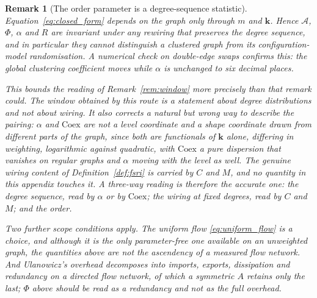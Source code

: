 \documentclass[11pt,a4paper]{article}
\newtheorem{remark}{Remark}
\begin{document}
\begin{remark}[The order parameter is a degree-sequence statistic]
\label{rem:degree_only}
Equation~\eqref{eq:closed_form} depends on the graph only through $m$ and
$\mathbf{k}$. Hence $\mathcal{A}$, $\Phi$, $\alpha$ and $R$ are invariant under
any rewiring that preserves the degree sequence, and in particular they cannot
distinguish a clustered graph from its configuration-model randomisation. A
numerical check on double-edge swaps confirms this: the global clustering
coefficient moves while $\alpha$ is unchanged to six decimal places.

This bounds the reading of Remark~\ref{rem:window} more precisely than that
remark could. The window obtained by this route is a statement about
\emph{degree distributions} and not about wiring. It also corrects a natural
but wrong way to describe the pairing: $\alpha$ and $\mathrm{Coex}$ are not a
level coordinate and a shape coordinate drawn from different parts of the
graph, since both are functionals of $\mathbf{k}$ alone, differing in
weighting, logarithmic against quadratic, with $\mathrm{Coex}$ a pure
dispersion that vanishes on regular graphs and $\alpha$ moving with the level
as well. The genuine wiring content of Definition~\ref{def:fsri} is carried by
$C$ and $M$, and no quantity in this appendix touches it. A three-way reading
is therefore the accurate one: the degree sequence, read by $\alpha$ or by
$\mathrm{Coex}$; the wiring at fixed degrees, read by $C$ and $M$; and the
order.

Two further scope conditions apply. The uniform flow \eqref{eq:uniform_flow} is
a choice, and although it is the only parameter-free one available on an
unweighted graph, the quantities above are not the ascendency of a measured
flow network. And Ulanowicz's overhead decomposes into imports, exports,
dissipation and redundancy on a directed flow network, of which a symmetric $A$
retains only the last; $\Phi$ above should be read as a redundancy and not as
the full overhead.
\end{remark}
\end{document}
